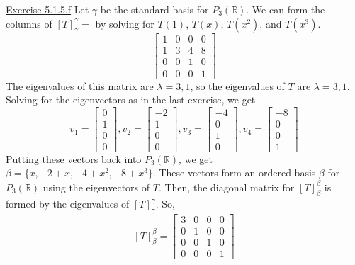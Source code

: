 \documentclass{exam}
\begin{document}
\underline{Exercise 5.1.5.f}
\newline
\newline
Let $\gamma$ be the standard basis for $P_3(\mathbb{R})$. We can form the columns of $[T]_\gamma^\gamma=$ by solving for $T(1)$, $T(x)$, $T(x^2)$, and $T(x^3)$.
\[
\begin{bmatrix}
    1 & 0 & 0 & 0 \\
    1 & 3 & 4 & 8 \\
    0 & 0 & 1 & 0 \\
    0 & 0 & 0 & 1
\end{bmatrix}
\]
The eigenvalues of this matrix are $\lambda=3,1$, so the eigenvalues of $T$ are $\lambda=3,1$. Solving for the eigenvectors as in the last exercise, we get
\[
v_1=
\begin{bmatrix}
    0 \\
    1 \\
    0 \\
    0
\end{bmatrix},
v_2=
\begin{bmatrix}
    -2 \\
    1 \\
    0 \\
    0
\end{bmatrix},
v_3=
\begin{bmatrix}
    -4 \\
    0 \\
    1 \\
    0
\end{bmatrix},
v_4=
\begin{bmatrix}
    -8 \\
    0 \\
    0 \\
    1
\end{bmatrix}
\]
Putting these vectors back into $P_3(\mathbb{R})$, we get $\beta=\{x,-2+x,-4+x^2,-8+x^3\}$. These vectors form an ordered basis $\beta$ for $P_3(\mathbb{R})$ using the eigenvectors of $T$. Then, the diagonal matrix for $[T]_\beta^\beta$ is formed by the eigenvalues of $[T]_\gamma^\gamma$. So,
\[
[T]_\beta^\beta=
\begin{bmatrix}
    3 & 0 & 0 & 0 \\
    0 & 1 & 0 & 0 \\
    0 & 0 & 1 & 0 \\
    0 & 0 & 0 & 1
\end{bmatrix}
\]
\newline
\end{document}
